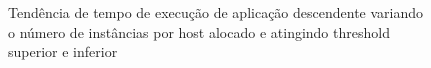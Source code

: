\documentclass[twoside,english,brazilian]{UNISINOSartigo}
\begin{document}
\begin{itemize}
\begin{figure}
\\
\vspace{-0.5\baselineskip}
\\
\caption{Tendência de tempo de execução de aplicação descendente variando o número de instâncias por host alocado e atingindo threshold superior e inferior}
\label{fig:trend_des}
\end{figure}


\end{itemize}
\end{document}
